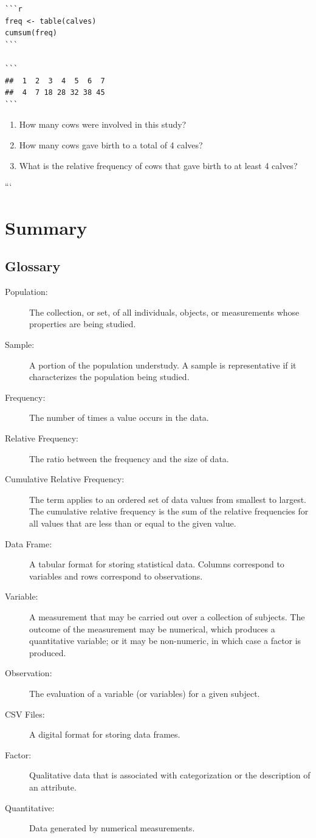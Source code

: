 \documentclass[]{krantz}
\theoremstyle{definition}
\theoremstyle{definition}
\theoremstyle{definition}
\theoremstyle{remark}
\begin{document}
\begin{verbatim}
```r
freq <- table(calves)
cumsum(freq)
```

```
##  1  2  3  4  5  6  7 
##  4  7 18 28 32 38 45
```
\end{verbatim}

\begin{enumerate}
\def\labelenumi{\arabic{enumi}.}
\item
  How many cows were involved in this study?
\item
  How many cows gave birth to a total of 4 calves?
\item
  What is the relative frequency of cows that gave birth to at least 4
  calves?
\end{enumerate}

```

\section{Summary}\label{summary-1}

\subsection*{Glossary}\label{glossary}


\begin{description}
\item[Population:]
The collection, or set, of all individuals, objects, or measurements
whose properties are being studied.
\item[Sample:]
A portion of the population understudy. A sample is representative if it
characterizes the population being studied.
\item[Frequency:]
The number of times a value occurs in the data.
\item[Relative Frequency:]
The ratio between the frequency and the size of data.
\item[Cumulative Relative Frequency:]
The term applies to an ordered set of data values from smallest to
largest. The cumulative relative frequency is the sum of the relative
frequencies for all values that are less than or equal to the given
value.
\item[Data Frame:]
A tabular format for storing statistical data. Columns correspond to
variables and rows correspond to observations.
\item[Variable:]
A measurement that may be carried out over a collection of subjects. The
outcome of the measurement may be numerical, which produces a
quantitative variable; or it may be non-numeric, in which case a factor
is produced.
\item[Observation:]
The evaluation of a variable (or variables) for a given subject.
\item[CSV Files:]
A digital format for storing data frames.
\item[Factor:]
Qualitative data that is associated with categorization or the
description of an attribute.
\item[Quantitative:]
Data generated by numerical measurements.
\end{description}
\end{document}
